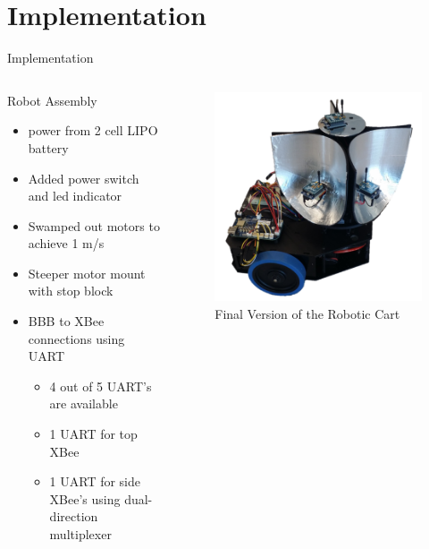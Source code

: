 \documentclass{beamer}
\begin{document}

\section{Implementation}

\begin{frame}{Implementation}
  \begin{columns}
    \begin{block}{Robot Assembly}
      \begin{itemize}
      	\item power from 2 cell LIPO battery
        \item Added power switch and led indicator
        \item Swamped out motors to achieve 1 m/s
        \item Steeper motor mount with stop block
        \item BBB to XBee connections using UART
        \begin{itemize}
        	\item 4 out of 5 UART's are available
        	\item 1 UART for top XBee
        	\item 1 UART for side XBee's using dual-direction multiplexer
        \end{itemize}
      \end{itemize}
    \end{block}
    \begin{figure}
      \centering
      \includegraphics[width=\textwidth]{figs/img/Finalized_robot.png}
      \caption{Final Version of the Robotic Cart}
      \label{fig:FinalizedRobot}
    \end{figure}
  \end{columns}
\end{frame}
\end{document}
